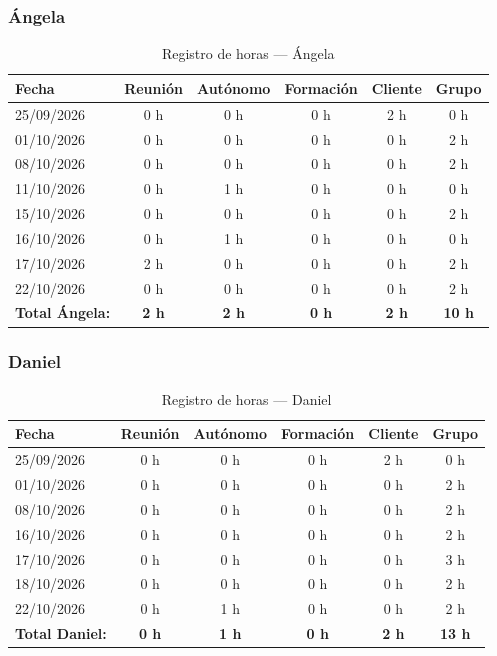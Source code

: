 \subsubsection{Ángela}
\begin{table}[H]
\centering
\small
\begin{tabularx}{\textwidth}{l c c c c c}
\toprule
\textbf{Fecha} & \textbf{Reunión} & \textbf{Autónomo} & \textbf{Formación} & \textbf{Cliente} & \textbf{Grupo} \\
\midrule
25/09/2026 & 0 h & 0 h & 0 h & 2 h & 0 h \\
01/10/2026 & 0 h & 0 h & 0 h & 0 h & 2 h \\
08/10/2026 & 0 h & 0 h & 0 h & 0 h & 2 h \\
11/10/2026 & 0 h & 1 h & 0 h & 0 h & 0 h \\
15/10/2026 & 0 h & 0 h & 0 h & 0 h & 2 h \\
16/10/2026 & 0 h & 1 h & 0 h & 0 h & 0 h \\
17/10/2026 & 2 h & 0 h & 0 h & 0 h & 2 h \\
22/10/2026 & 0 h & 0 h & 0 h & 0 h & 2 h \\
\midrule
\textbf{Total Ángela:} & \textbf{2 h} & \textbf{2 h} & \textbf{0 h} & \textbf{2 h} & \textbf{10 h} \\
\bottomrule
\end{tabularx}
\caption{Registro de horas — Ángela}
\end{table}

\subsubsection{Daniel}
\begin{table}[H]
\centering
\small
\begin{tabularx}{\textwidth}{l c c c c c}
\toprule
\textbf{Fecha} & \textbf{Reunión} & \textbf{Autónomo} & \textbf{Formación} & \textbf{Cliente} & \textbf{Grupo} \\
\midrule
25/09/2026 & 0 h & 0 h & 0 h & 2 h & 0 h \\
01/10/2026 & 0 h & 0 h & 0 h & 0 h & 2 h \\
08/10/2026 & 0 h & 0 h & 0 h & 0 h & 2 h \\
16/10/2026 & 0 h & 0 h & 0 h & 0 h & 2 h \\
17/10/2026 & 0 h & 0 h & 0 h & 0 h & 3 h \\
18/10/2026 & 0 h & 0 h & 0 h & 0 h & 2 h \\
22/10/2026 & 0 h & 1 h & 0 h & 0 h & 2 h \\
\midrule
\textbf{Total Daniel:} & \textbf{0 h} & \textbf{1 h} & \textbf{0 h} & \textbf{2 h} & \textbf{13 h} \\
\bottomrule
\end{tabularx}
\caption{Registro de horas — Daniel}
\end{table}
